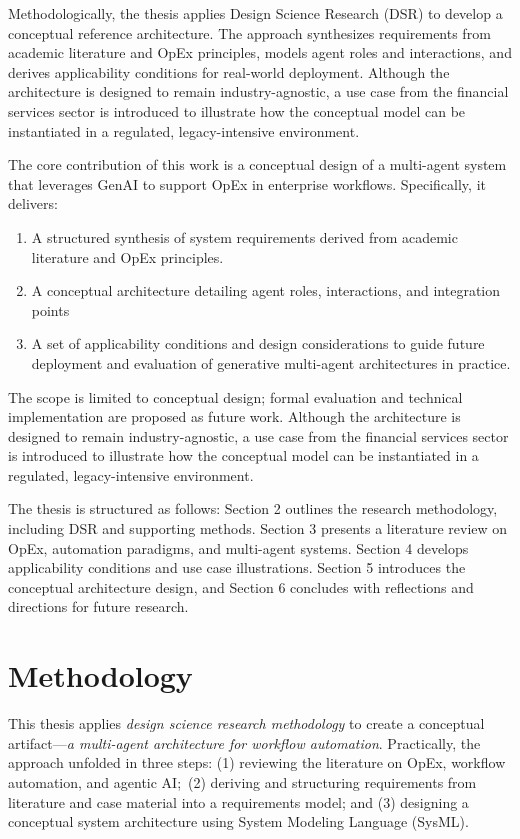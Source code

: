 Methodologically, the thesis applies Design Science Research (DSR) to develop a conceptual reference architecture. The approach synthesizes requirements from academic literature and OpEx principles, models agent roles and interactions, and derives applicability conditions for real-world deployment.
Although the architecture is designed to remain industry-agnostic, a use case from the financial services sector is introduced to illustrate how the conceptual model can be instantiated in a regulated, legacy-intensive environment.

The core contribution of this work is a conceptual design of a multi-agent system that leverages GenAI to support OpEx in enterprise workflows. Specifically, it delivers:
\begin{enumerate}
    \item A structured synthesis of system requirements derived from academic literature and OpEx principles.
    \item A conceptual architecture detailing agent roles, interactions, and integration points
    \item A set of applicability conditions and design considerations to guide future deployment and evaluation of generative multi-agent architectures in practice.
\end{enumerate}

The scope is limited to conceptual design; formal evaluation and technical implementation are proposed as future work. Although the architecture is designed to remain industry-agnostic, a use case from the financial services sector is introduced to illustrate how the conceptual model can be instantiated in a regulated, legacy-intensive environment.

The thesis is structured as follows: Section 2 outlines the research methodology, including DSR and supporting methods. Section 3 presents a literature review on OpEx, automation paradigms, and multi-agent systems. Section 4 develops applicability conditions and use case illustrations. Section 5 introduces the conceptual architecture design, and Section 6 concludes with reflections and directions for future research.

\section{Methodology}\label{sec:method}
This thesis applies \emph{design science research methodology} to create a conceptual artifact---\emph{a multi-agent architecture for workflow automation}. Practically, the approach unfolded in three steps: (1) reviewing the literature on OpEx, workflow automation, and agentic AI;~(2) deriving and structuring requirements from literature and case material into a requirements model; and (3) designing a conceptual system architecture using System Modeling Language (SysML).

